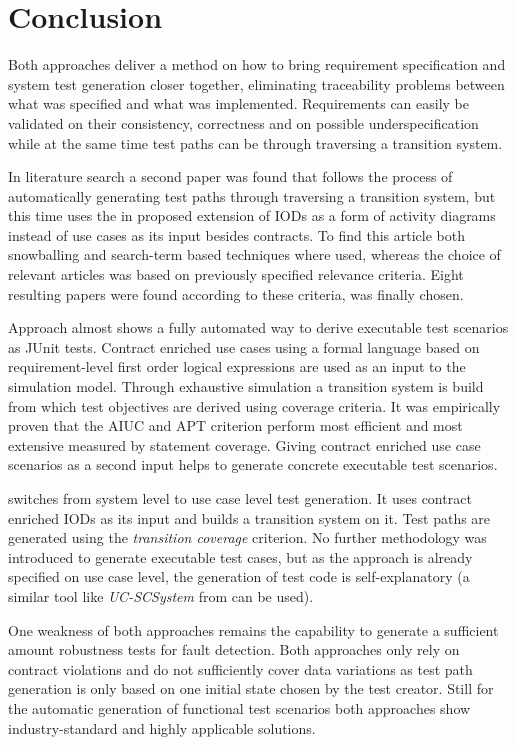 \section{Conclusion} \label{conclusion}

Both approaches deliver a method on how to bring requirement specification and system test generation closer together, eliminating traceability problems between what was specified and what was implemented. Requirements can easily be validated on their consistency, correctness and on possible underspecification while at the same time test paths can be through traversing a transition system. 

In literature search a second paper was found that follows the process of automatically generating test paths through traversing a transition system, but this time uses the in \cite{ClementineNebut2006} proposed extension of IODs as a form of activity diagrams instead of use cases as its input besides contracts. To find this article both snowballing and search-term based techniques where used, whereas the choice of relevant articles was based on previously specified relevance criteria. Eight resulting papers were found according to these criteria, \cite{NajlaRaza2007} was finally chosen. 

Approach \cite{ClementineNebut2006} almost shows a fully automated way to derive executable test scenarios as JUnit tests. Contract enriched use cases using a formal language based on requirement-level first order logical expressions are used as an input to the simulation model. Through exhaustive simulation a transition system is build from which test objectives are derived using coverage criteria. It was empirically proven that the AIUC and APT criterion perform most efficient and most extensive measured by statement coverage. Giving contract enriched use case scenarios as a second input helps to generate concrete executable test scenarios. 

\cite{ClementineNebut2006} switches from system level to use case level test generation. It uses contract enriched IODs as its input and builds a transition system on it. Test paths are generated using the \textit{transition coverage} criterion. No further methodology was introduced to generate executable test cases, but as the approach is already specified on use case level, the generation of test code is self-explanatory (a similar tool like \textit{UC-SCSystem} from \cite{ClementineNebut2006} can be used).

One weakness of both approaches remains the capability to generate a sufficient amount robustness tests for fault detection. Both approaches only rely on contract violations and do not sufficiently cover data variations as test path generation is only based on one initial state chosen by the test creator. Still for the automatic generation of functional test scenarios both approaches show industry-standard and highly applicable solutions.